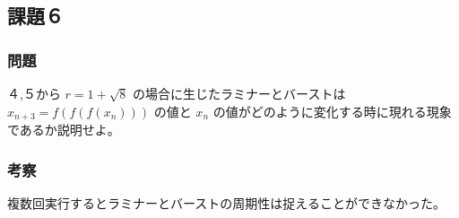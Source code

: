 \subsection{課題６}
\subsubsection{問題}
４,５から $r = 1 + \sqrt{8}$ の場合に生じたラミナーとバーストは$x_{n+3} = f \left( f \left( f \left( x_n \right) \right) \right)$ の値と $x_n$ の値がどのように変化する時に現れる現象であるか説明せよ。
\subsubsection{考察}
複数回実行するとラミナーとバーストの周期性は捉えることができなかった。
